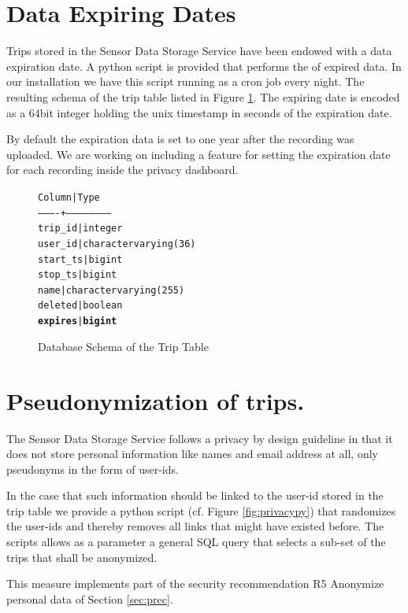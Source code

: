 \section{Data Expiring Dates}
Trips stored in the Sensor Data Storage Service have been endowed with
a data expiration date. A python script is provided that performs the
of expired data. In our installation we have this script running as a
cron job every night. The resulting schema of the trip table listed in
Figure \ref{fig:TripScheme}. The expiring date is encoded as a 64bit
integer holding the unix timestamp in seconds of the expiration date.

By default the expiration data is set to one year after the recording
was uploaded. We are working on including a feature for setting the
expiration date for each recording inside the privacy dashboard.

\begin{figure}
\begin{center}
\begin{alltt}
  Column  |          Type
----------+------------------------
 trip_id  | integer
 user_id  | character varying(36)
 start_ts | bigint
 stop_ts  | bigint
 name     | character varying(255)
 deleted  | boolean
 \textbf{expires}  | \textbf{bigint}
\end{alltt}
\end{center}
\caption{Database Schema of the Trip Table}
\label{fig:TripScheme}
\end{figure}

\section{Pseudonymization of trips.}
The Sensor Data Storage Service follows a privacy by design guideline
in that it does not store personal information like names and email
address at all, only pseudonyms in the form of user-ids.

In the case that such information should be linked to the user-id
stored in the trip table we provide a python script (cf. Figure
\ref{fig:privacypy}) that randomizes the user-ids and thereby removes
all links that might have existed before. The scripts allows as a
parameter a general SQL query that selects a sub-set of the trips that
shall be anonymized.

This measure implements part of the security recommendation R5
Anonymize personal data of Section \ref{sec:prec}.

